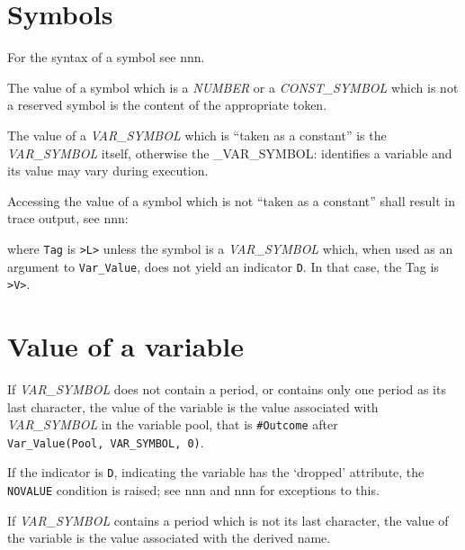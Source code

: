 \section{Symbols}\label{symbols}

For the syntax of a symbol see nnn.

The value of a symbol which is a \emph{NUMBER} or a \emph{CONST\_SYMBOL}
which is not a reserved symbol is the content of the appropriate token.

The value of a \emph{VAR\_SYMBOL} which is ``taken as a constant'' is
the \emph{VAR\_SYMBOL} itself, otherwise the \_VAR\_SYMBOL: identifies a
variable and its value may vary during execution.

Accessing the value of a symbol which is not ``taken as a constant''
shall result in trace output, see nnn:



where \texttt{Tag} is
\texttt{\textquotesingle{}\textgreater{}L\textgreater{}\textquotesingle{}}
unless the symbol is a \emph{VAR\_SYMBOL} which, when used as an
argument to \texttt{Var\_Value}, does not yield an indicator
\texttt{\textquotesingle{}D\textquotesingle{}}. In that case, the Tag is
\texttt{\textquotesingle{}\textgreater{}V\textgreater{}\textquotesingle{}}.

\section{Value of a variable}\label{value-of-a-variable}

If \emph{VAR\_SYMBOL} does not contain a period, or contains only one
period as its last character, the value of the variable is the value
associated with \emph{VAR\_SYMBOL} in the variable pool, that is
\texttt{\#Outcome} after
\texttt{Var\_Value(Pool,\ VAR\_SYMBOL,\ \textquotesingle{}0\textquotesingle{})}.

If the indicator is \texttt{\textquotesingle{}D\textquotesingle{}},
indicating the variable has the `dropped' attribute, the
\texttt{NOVALUE} condition is raised; see nnn and nnn for exceptions to
this.



If \emph{VAR\_SYMBOL} contains a period which is not its last character,
the value of the variable is the value associated with the derived name.

